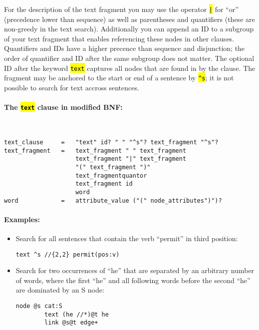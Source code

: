 \documentclass[12pt]{scrartcl}
\newcommand{\code}[1]{\hl{\texttt{#1}}}
\begin{document}
For the description of the text fragment you may use the operator \code{|} for “or” (precedence lower than sequence) as well as parentheses and quantifiers (these are non-greedy in the text search).
Additionally you can append an ID to a subgroup of your text fragment that enables referencing these nodes in other clauses.
Quantifiers and IDs have a higher precence than sequence and disjunction; the order of quantifier and ID after the same subgroup does not matter.
The optional ID after the keyword \code{text} captures all nodes that are found in by the clause.
The fragment may be anchored to the start or end of a sentence by \code{\textasciicircum s}; it is not possible to search for text accross sentences.

\paragraph*{The \code{text} clause in modified BNF:}
~
\begin{lstlisting}
text_clause     =   "text" id? " " "^s"? text_fragment "^s"?
text_fragment   =   text_fragment " " text_fragment
                    text_fragment "|" text_fragment
                    "(" text_fragment ")"
                    text_fragmentquantor
                    text_fragment id
                    word
word            =   attribute_value ("(" node_attributes")")?
\end{lstlisting}

\paragraph*{Examples:}
\begin{itemize}
	\item Search for all sentences that contain the verb “permit” in third position:
	\begin{lstlisting}[gobble=8,aboveskip=.6em,belowskip=.2em]
		text ^s //{2,2} permit(pos:v)
	\end{lstlisting}
	\item Search for two occurrences of “he” that are separated by an arbitrary number of words, where the first “he” and all following words before the second “he” are dominated by an S node:
	\begin{lstlisting}[gobble=8,aboveskip=.6em,belowskip=.2em]
		node @s cat:S
		text (he //*)@t he
		link @s@t edge+
	\end{lstlisting}
\end{itemize}
\end{document}
